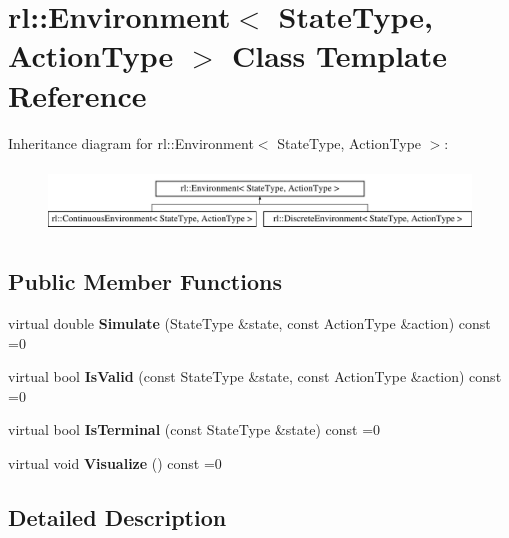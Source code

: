 \hypertarget{classrl_1_1_environment}{}\section{rl\+:\+:Environment$<$ State\+Type, Action\+Type $>$ Class Template Reference}
\label{classrl_1_1_environment}
Inheritance diagram for rl\+:\+:Environment$<$ State\+Type, Action\+Type $>$\+:\begin{figure}[H]
\begin{center}
\leavevmode
\includegraphics[height=1.750000cm]{classrl_1_1_environment}
\end{center}
\end{figure}
\subsection*{Public Member Functions}
\begin{DoxyCompactItemize}
\item 
\hypertarget{classrl_1_1_environment_ad97a592b7af8bb74859ebc82192feffe}{}\label{classrl_1_1_environment_ad97a592b7af8bb74859ebc82192feffe} 
virtual double {\bfseries Simulate} (State\+Type \&state, const Action\+Type \&action) const =0
\item 
\hypertarget{classrl_1_1_environment_ad10d85fc78ba844d5c380edd2dbeddec}{}\label{classrl_1_1_environment_ad10d85fc78ba844d5c380edd2dbeddec} 
virtual bool {\bfseries Is\+Valid} (const State\+Type \&state, const Action\+Type \&action) const =0
\item 
\hypertarget{classrl_1_1_environment_a592fbdd73b9b4145a4460e101949698c}{}\label{classrl_1_1_environment_a592fbdd73b9b4145a4460e101949698c} 
virtual bool {\bfseries Is\+Terminal} (const State\+Type \&state) const =0
\item 
\hypertarget{classrl_1_1_environment_a6d763bb0ee28848406322e04123eba3e}{}\label{classrl_1_1_environment_a6d763bb0ee28848406322e04123eba3e} 
virtual void {\bfseries Visualize} () const =0
\end{DoxyCompactItemize}


\subsection{Detailed Description}
